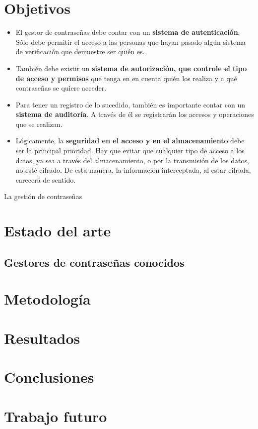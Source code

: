 \documentclass{\ClassPath/viu-tfm-template}
\begin{document}
\chapter{Objetivos}


\begin{itemize}
    \item El gestor de contraseñas debe contar con un \textbf{sistema de autenticación}. Sólo debe permitir el acceso a las personas que hayan pasado algún sistema de verificación que demuestre ser quién es.

    \item También debe existir un \textbf{sistema de autorización, que controle el tipo de acceso y permisos} que tenga en en cuenta quién los realiza y a qué contraseñas se quiere acceder.

    \item Para tener un registro de lo sucedido, también es importante contar con un \textbf{sistema de auditoría}. A través de él se registrarán los accesos y operaciones que se realizan.

    \item Lógicamente, la \textbf{seguridad en el acceso y en el almacenamiento} debe ser la principal prioridad. Hay que evitar que cualquier tipo de acceso a los datos, ya sea a través del almacenamiento, o por la transmisión de los datos, no esté cifrado. De esta manera, la información interceptada, al estar cifrada, carecerá de sentido.
\end{itemize}

La gestión de contraseñas



\chapter{Estado del arte}

\section{Gestores de contraseñas conocidos}


\chapter{Metodología}


\chapter{Resultados}


\chapter{Conclusiones}


\chapter{Trabajo futuro}
\end{document}
